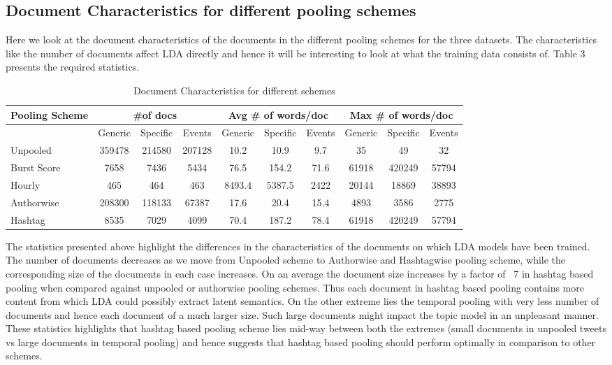\documentclass[10pt,a5paper,twoside]{article}
\begin{document}
\subsection{Document Characteristics for different pooling schemes}
Here we look at the document characteristics of the documents in the different pooling schemes for the three datasets. The characteristics like the number of documents affect LDA directly and hence it will be interesting to look at what the training data consists of. Table 3 presents the required statistics.

\begin{table}[!h]
\setcounter{table}{3}
\centering
\resizebox{14cm}{!} 
{
	\begin{tabular}{|l|ccc|ccc|ccc|}
	\hline
	Pooling Scheme  & \multicolumn {3}{c}{\#of docs} & \multicolumn {3}{c}{Avg \# of words/doc} & \multicolumn {3}{c|}{Max \# of words/doc}\\
	\hline
	 & Generic & Specific & Events &  Generic & Specific & Events &  Generic & Specific & Events\\
	\hline
	Unpooled & 359478 & 214580 & 207128 & 10.2 & 10.9 & 9.7 & 35 & 49 & 32 \\
	\hline
	Burst Score & 7658 & 7436 & 5434 & 76.5 & 154.2 & 71.6 & 61918 & 420249 & 57794 \\
	\hline
	Hourly & 465 & 464 & 463 & 8493.4 & 5387.5 & 2422 & 20144 & 18869 & 38893 \\
	\hline
	Authorwise & 208300 & 118133 & 67387 & 17.6 & 20.4 & 15.4 & 4893 & 3586 & 2775 \\
	\hline
	Hashtag & 8535 & 7029 & 4099 & 70.4 & 187.2 & 78.4 & 61918 & 420249 & 57794 \\
	\hline
	\end{tabular}
}
\caption{Document Characteristics for different schemes}\label{Table}
\end{table}

The statistics presented above highlight the differences in the characteristics of the documents on which LDA models have been trained. The number of documents decreases as we move from Unpooled scheme to Authorwise and Hashtagwise pooling scheme, while the corresponding size of the documents in each case increases. On an average the document size increases by a factor of ~7 in hashtag based pooling when compared against unpooled or authorwise pooling schemes. Thus each document in hashtag based pooling contains more content from which LDA could possibly extract latent semantics. On the other extreme lies the temporal pooling with very less number of documents and hence each document of a much larger size. Such large documents might impact the topic model in an unpleasant manner. These statistics highlights that hashtag based pooling scheme lies mid-way between both the extremes (small documents in unpooled tweets vs large documents in temporal pooling) and hence suggests that hashtag based pooling should perform optimally in comparison to other schemes.
\end{document}
